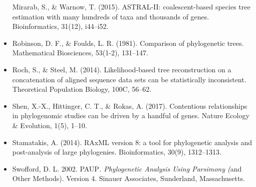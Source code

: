 \documentclass[11pt]{article}
\begin{document}
\begin{itemize}
  Mirarab, S., \& Warnow, T. (2015). ASTRAL-II: coalescent-based species
  tree estimation with many hundreds of taxa and thousands of genes.
  Bioinformatics, 31(12), i44--i52.
\item
  Robinson, D. F., \& Foulds, L. R. (1981). Comparison of phylogenetic
  trees. Mathematical Biosciences, 53(1-2), 131--147.
\item
  Roch, S., \& Steel, M. (2014). Likelihood-based tree reconstruction on
  a concatenation of aligned sequence data sets can be statistically
  inconsistent. Theoretical Population Biology, 100C, 56--62.
\item
  Shen, X.-X., Hittinger, C. T., \& Rokas, A. (2017). Contentious
  relationships in phylogenomic studies can be driven by a handful of
  genes. Nature Ecology \& Evolution, 1(5), 1--10.
\item
  Stamatakis, A. (2014). RAxML version 8: a tool for phylogenetic
  analysis and post-analysis of large phylogenies. Bioinformatics,
  30(9), 1312--1313.
\item
  Swofford, D. L. 2002. PAUP\emph{. Phylogenetic Analysis Using
  Parsimony (}and Other Methods). Version 4. Sinauer Associates,
  Sunderland, Massachusetts.
\end{itemize}


    
    
    
    
\end{document}
